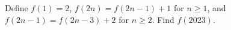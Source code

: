 Define $f(1)=2$, $f(2n)=f(2n-1)+1$ for $n\ge1$, and $f(2n-1)=f(2n-3)+2$ for $n\ge2$. Find $f(2023)$.
